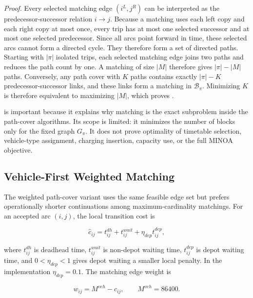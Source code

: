 \noindent\textit{Proof.}
Every selected matching edge \((i^L,j^R)\) can be interpreted as the
predecessor-successor relation \(i\rightarrow j\). Because a matching uses each
left copy and each right copy at most once, every trip has at most one selected
successor and at most one selected predecessor. Since all arcs point forward in
time, these selected arcs cannot form a directed cycle. They therefore form a
set of directed paths. Starting with \(|\pi|\) isolated trips, each selected
matching edge joins two paths and reduces the path count by one. A matching of
size \(|M|\) therefore gives \(|\pi|-|M|\) paths. Conversely, any path cover
with \(K\) paths contains exactly \(|\pi|-K\) predecessor-successor links, and
these links form a matching in \(\mathcal{B}_\pi\). Minimizing \(K\) is
therefore equivalent to maximizing \(|M|\), which proves
.

 is important because it explains why matching
is the exact subproblem inside the path-cover algorithms. Its scope is limited:
it minimizes the number of blocks only for the fixed graph \(G_\pi\). It does
not prove optimality of timetable selection, vehicle-type assignment, charging
insertion, capacity use, or the full MINOA objective.

\subsection{Vehicle-First Weighted Matching}

The weighted path-cover variant uses the same feasible edge set but prefers
operationally shorter continuations among maximum-cardinality matchings. For
an accepted arc \((i,j)\), the local transition cost is

\begin{equation}
\hat c_{ij}
=
t_{ij}^{dh}
+t_{ij}^{wait}
+\eta_{dep}t_{ij}^{dep},
\label{eq:weighted-local-cost}
\end{equation}

where \(t_{ij}^{dh}\) is deadhead time, \(t_{ij}^{wait}\) is non-depot waiting
time, \(t_{ij}^{dep}\) is depot waiting time, and \(0<\eta_{dep}<1\) gives
depot waiting a smaller local penalty. In the implementation
\(\eta_{dep}=0.1\). The matching edge weight is

\begin{equation}
w_{ij}=M^{veh}-\hat c_{ij},
\qquad M^{veh}=86400.
\label{eq:weighted-edge-main}
\end{equation}

